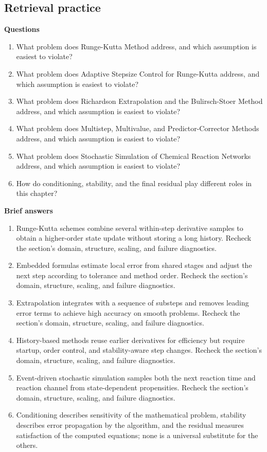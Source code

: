 \documentclass[10pt,letterpaper]{article}
\begin{document}
\subsection*{Retrieval practice}
\textbf{Questions}
\begin{enumerate}
\item What problem does Runge-Kutta Method address, and which assumption is easiest to violate?
\item What problem does Adaptive Stepsize Control for Runge-Kutta address, and which assumption is easiest to violate?
\item What problem does Richardson Extrapolation and the Bulirsch-Stoer Method address, and which assumption is easiest to violate?
\item What problem does Multistep, Multivalue, and Predictor-Corrector Methods address, and which assumption is easiest to violate?
\item What problem does Stochastic Simulation of Chemical Reaction Networks address, and which assumption is easiest to violate?
\item How do conditioning, stability, and the final residual play different roles in this chapter?
\end{enumerate}

\textbf{Brief answers}
\begin{enumerate}
\item Runge-Kutta schemes combine several within-step derivative samples to obtain a higher-order state update without storing a long history. Recheck the section's domain, structure, scaling, and failure diagnostics.
\item Embedded formulas estimate local error from shared stages and adjust the next step according to tolerance and method order. Recheck the section's domain, structure, scaling, and failure diagnostics.
\item Extrapolation integrates with a sequence of substeps and removes leading error terms to achieve high accuracy on smooth problems. Recheck the section's domain, structure, scaling, and failure diagnostics.
\item History-based methods reuse earlier derivatives for efficiency but require startup, order control, and stability-aware step changes. Recheck the section's domain, structure, scaling, and failure diagnostics.
\item Event-driven stochastic simulation samples both the next reaction time and reaction channel from state-dependent propensities. Recheck the section's domain, structure, scaling, and failure diagnostics.
\item Conditioning describes sensitivity of the mathematical problem, stability describes error propagation by the algorithm, and the residual measures satisfaction of the computed equations; none is a universal substitute for the others.
\end{enumerate}
\end{document}
